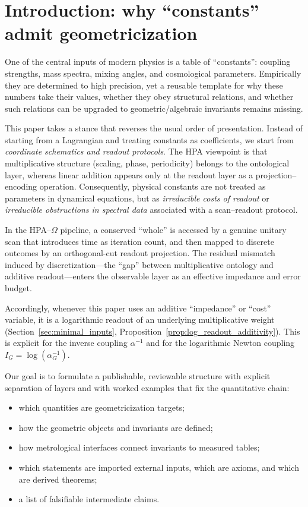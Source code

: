 \section{Introduction: why ``constants'' admit geometricization}
\label{sec:introduction}

One of the central inputs of modern physics is a table of ``constants'': coupling strengths, mass spectra, mixing angles, and cosmological parameters. Empirically they are determined to high precision, yet a reusable template for why these numbers take their values, whether they obey structural relations, and whether such relations can be upgraded to geometric/algebraic invariants remains missing.

This paper takes a stance that reverses the usual order of presentation. Instead of starting from a Lagrangian and treating constants as coefficients, we start from \emph{coordinate schematics and readout protocols}. The HPA viewpoint is that multiplicative structure (scaling, phase, periodicity) belongs to the ontological layer, whereas linear addition appears only at the readout layer as a projection--encoding operation. Consequently, physical constants are not treated as parameters in dynamical equations, but as \emph{irreducible costs of readout} or \emph{irreducible obstructions in spectral data} associated with a scan--readout protocol.

In the HPA--$\Omega$ pipeline, a conserved ``whole'' is accessed by a genuine unitary scan that introduces time as iteration count, and then mapped to discrete outcomes by an orthogonal-cut readout projection. The residual mismatch induced by discretization---the ``gap'' between multiplicative ontology and additive readout---enters the observable layer as an effective impedance and error budget.

Accordingly, whenever this paper uses an additive ``impedance'' or ``cost'' variable, it is a logarithmic readout of an underlying multiplicative weight (Section~\ref{sec:minimal_inputs}, Proposition~\ref{prop:log_readout_additivity}). This is explicit for the inverse coupling $\alpha^{-1}$ and for the logarithmic Newton coupling $I_G=\log(\alpha_G^{-1})$.

Our goal is to formulate a publishable, reviewable structure with explicit separation of layers and with worked examples that fix the quantitative chain:

\begin{itemize}
    \item which quantities are geometricization targets;
    \item how the geometric objects and invariants are defined;
    \item how metrological interfaces connect invariants to measured tables;
    \item which statements are imported external inputs, which are axioms, and which are derived theorems;
    \item a list of falsifiable intermediate claims.
\end{itemize}

